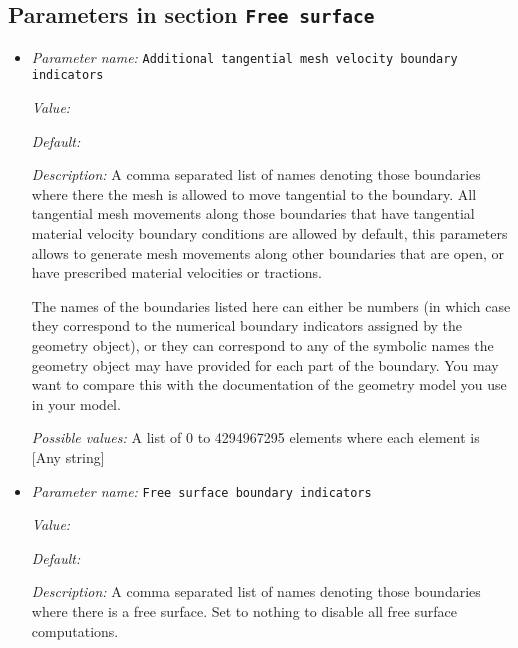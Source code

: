 \subsection{Parameters in section \tt Free surface}
\label{parameters:Free_20surface}

\begin{itemize}
\item {\it Parameter name:} {\tt Additional tangential mesh velocity boundary indicators}
\label{parameters:Free surface/Additional tangential mesh velocity boundary indicators}
\label{parameters:Free_20surface/Additional_20tangential_20mesh_20velocity_20boundary_20indicators}


{\it Value:} 


{\it Default:} 


{\it Description:} A comma separated list of names denoting those boundaries where there the mesh is allowed to move tangential to the boundary. All tangential mesh movements along those boundaries that have tangential material velocity boundary conditions are allowed by default, this parameters allows to generate mesh movements along other boundaries that are open, or have prescribed material velocities or tractions.

The names of the boundaries listed here can either be numbers (in which case they correspond to the numerical boundary indicators assigned by the geometry object), or they can correspond to any of the symbolic names the geometry object may have provided for each part of the boundary. You may want to compare this with the documentation of the geometry model you use in your model.


{\it Possible values:} A list of 0 to 4294967295 elements where each element is [Any string]
\item {\it Parameter name:} {\tt Free surface boundary indicators}
\label{parameters:Free surface/Free surface boundary indicators}
\label{parameters:Free_20surface/Free_20surface_20boundary_20indicators}


{\it Value:} 


{\it Default:} 


{\it Description:} A comma separated list of names denoting those boundaries where there is a free surface. Set to nothing to disable all free surface computations.


\end{itemize}
